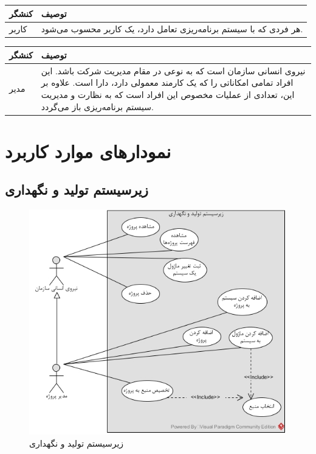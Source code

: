\begin{table}[H]
	\centering
	\begin{tabular}{|p{3cm}|p{8cm}|}
		\hline
		
		
		کنشگر	& توصیف  \\
		\hline
		کاربر &
		
	هر فردی که با سیستم  برنامه‌ریزی تعامل دارد، یک کاربر محسوب می‌شود.
		\\
		\hline
		
	\end{tabular}
\end{table}


\begin{table}[H]
	\centering
	\begin{tabular}{|p{3cm}|p{8cm}|}
		\hline
		
		
		کنشگر	& توصیف  \\
		\hline
		مدیر &
		
		نیروی انسانی سازمان است که به نوعی در مقام مدیریت شرکت باشد. این افراد تمامی امکاناتی را که یک کارمند معمولی  دارد، دارا است. علاوه بر این، تعدادی از عملیات مخصوص این افراد است که به نظارت و مدیریت سیستم برنامه‌ریزی باز می‌گردد.
		\\
		\hline
		
	\end{tabular}
\end{table}

\newpage
\section{نمودارهای موارد کاربرد}

\subsection{زیرسیستم تولید و نگهداری}
\begin{figure}[H]
	\centering
	\includegraphics[scale=0.8]{img/usecase/tolid}
	\caption{زیرسیستم تولید و نگهداری}
\end{figure}

